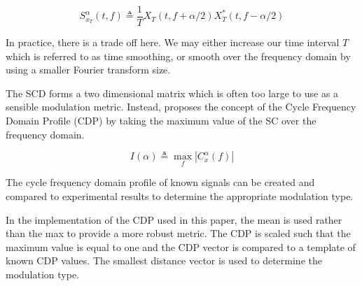 \begin{equation}
S_{x_T}^{\alpha}(t,f) \triangleq \frac{1}{T} X_T(t,f + \alpha / 2)X_T^*(t,f - \alpha / 2)
\label{eq:ScdDefined2}
\end{equation}

In practice, there is a trade off here.  We may either increase our time
interval $T$ which is referred to as time smoothing, or smooth over the frequency
domain by using a smaller Fourier transform size.

The SCD forms a two dimensional matrix which is often
too large to use as a sensible modulation metric.  Instead, \cite{kim2007}
proposes the concept of the Cycle Frequency Domain Profile (CDP) by taking the
maximum value of the SC over the frequency domain.

\begin{equation}
I(\alpha) \triangleq \max_f |C_x^{\alpha}(f)|
\label{eq:CdpDef}
\end{equation}

The cycle frequency domain profile of known signals can be created and compared
to experimental results to determine the appropriate modulation type.  

\begin{comment}
This method is dumb, I should determine the number of peaks or something and
compare peak location and size.
\end{comment}


In the implementation of the CDP used in this paper, the mean is used rather
than the max to provide a more robust metric.  The CDP is scaled such that the
maximum value is equal to one and the CDP vector is compared to a template of
known CDP values.  The smallest distance vector is used to determine the
modulation type.

